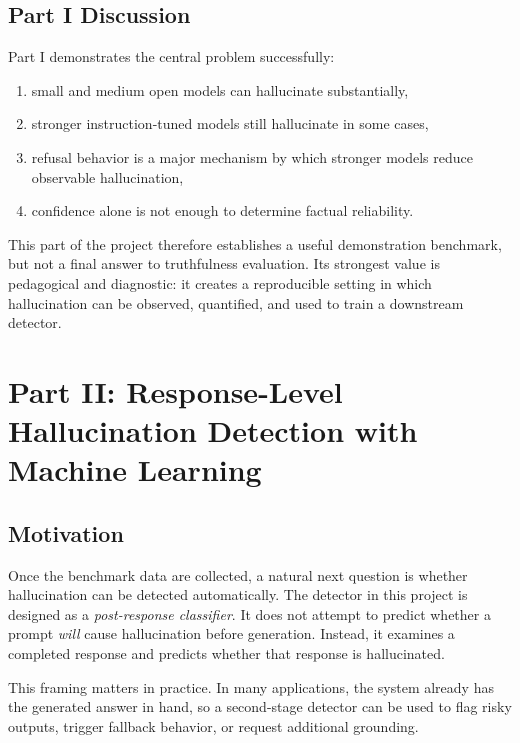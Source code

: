 \documentclass[11pt]{article}
\begin{document}
\subsection{Part I Discussion}
Part I demonstrates the central problem successfully:
\begin{enumerate}[leftmargin=1.5em]
    \item small and medium open models can hallucinate substantially,
    \item stronger instruction-tuned models still hallucinate in some cases,
    \item refusal behavior is a major mechanism by which stronger models reduce observable hallucination,
    \item confidence alone is not enough to determine factual reliability.
\end{enumerate}

This part of the project therefore establishes a useful demonstration benchmark, but not a final answer to truthfulness evaluation. Its strongest value is pedagogical and diagnostic: it creates a reproducible setting in which hallucination can be observed, quantified, and used to train a downstream detector.

\newpage
\section{Part II: Response-Level Hallucination Detection with Machine Learning}

\subsection{Motivation}
Once the benchmark data are collected, a natural next question is whether hallucination can be detected automatically. The detector in this project is designed as a \emph{post-response classifier}. It does not attempt to predict whether a prompt \emph{will} cause hallucination before generation. Instead, it examines a completed response and predicts whether that response is hallucinated.

This framing matters in practice. In many applications, the system already has the generated answer in hand, so a second-stage detector can be used to flag risky outputs, trigger fallback behavior, or request additional grounding.
\end{document}
